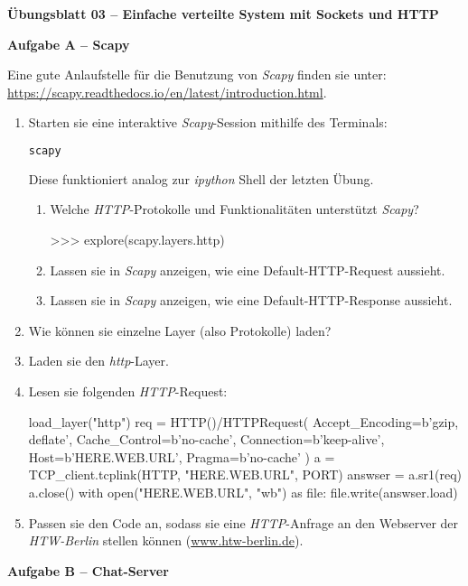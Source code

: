 \documentclass[paper=a4,fontsize=11pt]{scrartcl}%
\numberwithin{equation}{section}
\begin{document}
\begin{center}
\Large{\textbf{Übungsblatt 03 -- Einfache verteilte System mit Sockets und HTTP}}
\end{center}

\begin{center}\Large{\textbf{Aufgabe A -- Scapy}}\end{center}\vskip0.25in
Eine gute Anlaufstelle für die Benutzung von \emph{Scapy} finden sie unter: \url{https://scapy.readthedocs.io/en/latest/introduction.html}.
\begin{enumerate}
	\item Starten sie eine interaktive \emph{Scapy}-Session mithilfe des Terminals:
	\begin{lstlisting}[style=Bash, language=Bash]
scapy
	\end{lstlisting}
	Diese funktioniert analog zur \emph{ipython} Shell der letzten Übung.
	\begin{enumerate}
		\item Welche \emph{HTTP}-Protokolle und Funktionalitäten unterstützt \emph{Scapy}?
		\begin{python}
>>> explore(scapy.layers.http)
		\end{python}
		\item Lassen sie in \emph{Scapy} anzeigen, wie eine Default-HTTP-Request aussieht.
		\item Lassen sie in \emph{Scapy} anzeigen, wie eine Default-HTTP-Response aussieht.
	\end{enumerate}		
	\item Wie können sie einzelne Layer (also Protokolle) laden?
	\item Laden sie den \emph{http}-Layer.
	\item Lesen sie folgenden \emph{HTTP}-Request:
	\begin{python}
load_layer("http")
req = HTTP()/HTTPRequest(
    Accept_Encoding=b'gzip, deflate',
    Cache_Control=b'no-cache',
    Connection=b'keep-alive',
    Host=b'HERE.WEB.URL',
    Pragma=b'no-cache'
)
a = TCP_client.tcplink(HTTP, "HERE.WEB.URL", PORT)
answser = a.sr1(req)
a.close()
with open("HERE.WEB.URL", "wb") as file:
    file.write(answser.load)
\end{python}
	\item Passen sie den Code an, sodass sie eine \emph{HTTP}-Anfrage an den Webserver der \emph{HTW-Berlin} stellen können (\url{www.htw-berlin.de}).
\end{enumerate}

\begin{center}\Large{\textbf{Aufgabe B -- Chat-Server}}\end{center}\vskip0.25in
\end{document}

